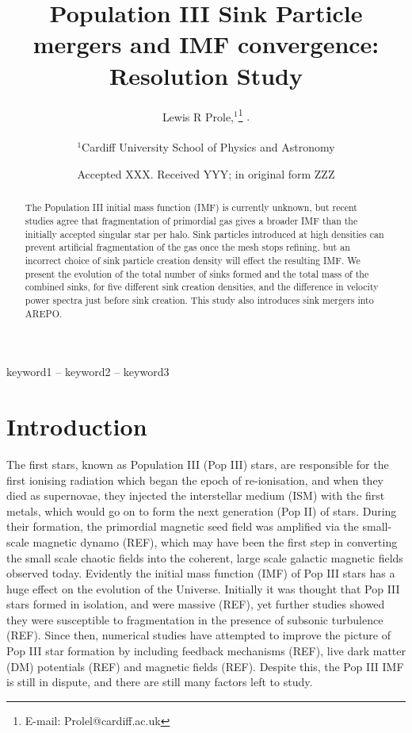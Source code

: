 \documentclass[fleqn,usenatbib]{mnras}
\title[Short title, max. 45 characters]{Population III Sink Particle mergers and IMF convergence: Resolution Study}
\author[L. R. Prole]{
Lewis R Prole,$^{1}$\thanks{E-mail: Prolel@cardiff.ac.uk}
$.$
$$
$$
\\
$^{1}$Cardiff University School of Physics and Astronomy\\
$$
$$
}
\date{Accepted XXX. Received YYY; in original form ZZZ}
\begin{document}
\label{firstpage}
\pagerange{\pageref{firstpage}--\pageref{lastpage}}
\maketitle

\begin{abstract}
The Population III initial mass function (IMF) is currently unknown, but recent studies agree that fragmentation of primordial gas gives a broader IMF than the initially accepted singular star per halo. Sink particles introduced at high densities can prevent artificial fragmentation of the gas once the mesh stops refining, but an incorrect choice of sink particle creation density will effect the resulting IMF. We present the evolution of the  total number of sinks formed and the total mass of the combined sinks, for five different sink creation densities, and the difference in velocity power spectra just before sink creation. This study also introduces sink mergers into AREPO.
\end{abstract}

\begin{keywords}
keyword1 -- keyword2 -- keyword3
\end{keywords}



\section{Introduction}
The first stars, known as Population III (Pop III) stars, are responsible for the first ionising radiation which began the epoch of re-ionisation, and when they died as supernovae, they injected the interstellar medium (ISM) with the first metals, which would go on to form the next generation (Pop II) of stars. During their formation, the primordial magnetic seed field was amplified via the small-scale magnetic dynamo (REF), which may have been the first step in converting the small scale chaotic fields into the coherent, large scale galactic magnetic fields observed today. Evidently the initial mass function (IMF) of Pop III stars has a huge effect on the evolution of the Universe. Initially it was thought that Pop III stars formed in isolation, and were massive (REF), yet further studies showed they were susceptible to fragmentation in the presence of subsonic turbulence (REF). Since then, numerical studies have attempted to improve the picture of Pop III star formation by including feedback mechanisms (REF), live dark matter (DM) potentials (REF) and magnetic fields (REF). Despite this, the Pop III IMF is still in dispute, and there are still many factors left to study.
\end{document}
